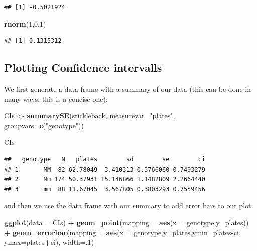 \documentclass[]{article}
\newenvironment{Shaded}{\begin{snugshade}}{\end{snugshade}}
\newcommand{\DataTypeTok}[1]{\textcolor[rgb]{0.13,0.29,0.53}{#1}}
\newcommand{\DecValTok}[1]{\textcolor[rgb]{0.00,0.00,0.81}{#1}}
\newcommand{\KeywordTok}[1]{\textcolor[rgb]{0.13,0.29,0.53}{\textbf{#1}}}
\newcommand{\NormalTok}[1]{#1}
\newcommand{\OperatorTok}[1]{\textcolor[rgb]{0.81,0.36,0.00}{\textbf{#1}}}
\newcommand{\StringTok}[1]{\textcolor[rgb]{0.31,0.60,0.02}{#1}}
\begin{document}
\begin{verbatim}
## [1] -0.5021924
\end{verbatim}

\begin{Shaded}
\begin{Highlighting}[]
\KeywordTok{rnorm}\NormalTok{(}\DecValTok{1}\NormalTok{,}\DecValTok{0}\NormalTok{,}\DecValTok{1}\NormalTok{)}
\end{Highlighting}
\end{Shaded}

\begin{verbatim}
## [1] 0.1315312
\end{verbatim}

\hypertarget{plotting-confidence-intervalls}{%
\subsection{Plotting Confidence
intervalls}\label{plotting-confidence-intervalls}}

We first generate a data frame with a summary of our data (this can be
done in many ways, this is a concise one):

\begin{Shaded}
\begin{Highlighting}[]
\NormalTok{CIs <-}\StringTok{ }\KeywordTok{summarySE}\NormalTok{(stickleback, }\DataTypeTok{measurevar=}\StringTok{"plates"}\NormalTok{, }\DataTypeTok{groupvars=}\KeywordTok{c}\NormalTok{(}\StringTok{"genotype"}\NormalTok{))}

\NormalTok{CIs}
\end{Highlighting}
\end{Shaded}

\begin{verbatim}
##   genotype   N   plates        sd        se        ci
## 1       MM  82 62.78049  3.410313 0.3766060 0.7493279
## 2       Mm 174 50.37931 15.146866 1.1482809 2.2664440
## 3       mm  88 11.67045  3.567805 0.3803293 0.7559456
\end{verbatim}

and then we use the data frame with our summary to add error bars to our
plot:

\begin{Shaded}
\begin{Highlighting}[]
\KeywordTok{ggplot}\NormalTok{(}\DataTypeTok{data =}\NormalTok{ CIs) }\OperatorTok{+}
\StringTok{  }\KeywordTok{geom_point}\NormalTok{(}\DataTypeTok{mapping =} \KeywordTok{aes}\NormalTok{(}\DataTypeTok{x =}\NormalTok{ genotype,}\DataTypeTok{y=}\NormalTok{plates)) }\OperatorTok{+}
\StringTok{  }\KeywordTok{geom_errorbar}\NormalTok{(}\DataTypeTok{mapping =} \KeywordTok{aes}\NormalTok{(}\DataTypeTok{x =}\NormalTok{ genotype,}\DataTypeTok{y=}\NormalTok{plates,}\DataTypeTok{ymin=}\NormalTok{plates}\OperatorTok{-}\NormalTok{ci, }\DataTypeTok{ymax=}\NormalTok{plates}\OperatorTok{+}\NormalTok{ci), }\DataTypeTok{width=}\NormalTok{.}\DecValTok{1}\NormalTok{) }
\end{Highlighting}
\end{Shaded}
\end{document}
